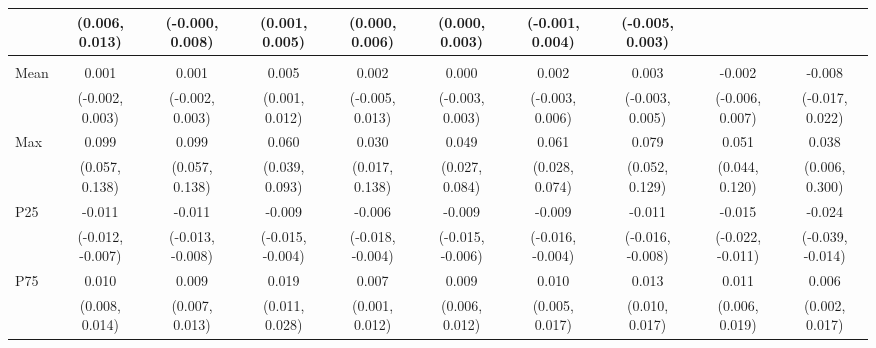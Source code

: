 {\begin{tabular}{l|c|c|c|c|c|c|c|c|c}
& {\scriptsize (0.006, 0.013)}
& {\scriptsize (-0.000, 0.008)}
& {\scriptsize (0.001, 0.005)}
& {\scriptsize (0.000, 0.006)}
& {\scriptsize (0.000, 0.003)}
& {\scriptsize (-0.001, 0.004)}
& {\scriptsize (-0.005, 0.003)}
\\ [0.1cm]
\hline
\noalign{\smallskip}
\multicolumn{10}{l}{\textbf{Effect with Leads and Lags}} \\
\noalign{\smallskip}
\hline
Mean
& 0.001 & 0.001 & 0.005 & 0.002 & 0.000 & 0.002 & 0.003 & -0.002 & -0.008 \\
& {\scriptsize (-0.002, 0.003)}
& {\scriptsize (-0.002, 0.003)}
& {\scriptsize (0.001, 0.012)}
& {\scriptsize (-0.005, 0.013)}
& {\scriptsize (-0.003, 0.003)}
& {\scriptsize (-0.003, 0.006)}
& {\scriptsize (-0.003, 0.005)}
& {\scriptsize (-0.006, 0.007)}
& {\scriptsize (-0.017, 0.022)}
\\ [0.1cm]
\hline
Max
& 0.099 & 0.099 & 0.060 & 0.030 & 0.049 & 0.061 & 0.079 & 0.051 & 0.038 \\
& {\scriptsize (0.057, 0.138)}
& {\scriptsize (0.057, 0.138)}
& {\scriptsize (0.039, 0.093)}
& {\scriptsize (0.017, 0.138)}
& {\scriptsize (0.027, 0.084)}
& {\scriptsize (0.028, 0.074)}
& {\scriptsize (0.052, 0.129)}
& {\scriptsize (0.044, 0.120)}
& {\scriptsize (0.006, 0.300)}
\\ [0.1cm]
\hline
P25
& -0.011 & -0.011 & -0.009 & -0.006 & -0.009 & -0.009 & -0.011 & -0.015 & -0.024 \\
& {\scriptsize (-0.012, -0.007)}
& {\scriptsize (-0.013, -0.008)}
& {\scriptsize (-0.015, -0.004)}
& {\scriptsize (-0.018, -0.004)}
& {\scriptsize (-0.015, -0.006)}
& {\scriptsize (-0.016, -0.004)}
& {\scriptsize (-0.016, -0.008)}
& {\scriptsize (-0.022, -0.011)}
& {\scriptsize (-0.039, -0.014)}
\\ [0.1cm]
\hline
P75
& 0.010 & 0.009 & 0.019 & 0.007 & 0.009 & 0.010 & 0.013 & 0.011 & 0.006 \\
& {\scriptsize (0.008, 0.014)}
& {\scriptsize (0.007, 0.013)}
& {\scriptsize (0.011, 0.028)}
& {\scriptsize (0.001, 0.012)}
& {\scriptsize (0.006, 0.012)}
& {\scriptsize (0.005, 0.017)}
& {\scriptsize (0.010, 0.017)}
& {\scriptsize (0.006, 0.019)}
& {\scriptsize (0.002, 0.017)}
\\ [0.1cm]
\hline
\hline
\end{tabular}
}
